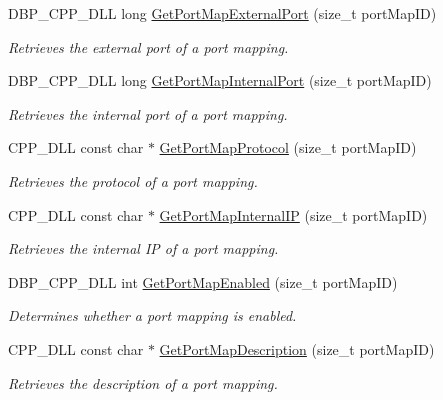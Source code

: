 \begin{DoxyCompactItemize}
DBP\_\-CPP\_\-DLL long \hyperlink{namespacemn_n_a_t_a592cb3bdeb5c5bd801a1a6f1f730007d}{GetPortMapExternalPort} (size\_\-t portMapID)
\begin{DoxyCompactList}\small\item\em Retrieves the external port of a port mapping. \item\end{DoxyCompactList}\item 
DBP\_\-CPP\_\-DLL long \hyperlink{namespacemn_n_a_t_ada1ec93ffca837a2fef02cb2d8466663}{GetPortMapInternalPort} (size\_\-t portMapID)
\begin{DoxyCompactList}\small\item\em Retrieves the internal port of a port mapping. \item\end{DoxyCompactList}\item 
CPP\_\-DLL const char $\ast$ \hyperlink{namespacemn_n_a_t_aee47b934f042fcfda5a6540bebbc4679}{GetPortMapProtocol} (size\_\-t portMapID)
\begin{DoxyCompactList}\small\item\em Retrieves the protocol of a port mapping. \item\end{DoxyCompactList}\item 
CPP\_\-DLL const char $\ast$ \hyperlink{namespacemn_n_a_t_ac37022019aa9496591be5c013f1e11f7}{GetPortMapInternalIP} (size\_\-t portMapID)
\begin{DoxyCompactList}\small\item\em Retrieves the internal IP of a port mapping. \item\end{DoxyCompactList}\item 
DBP\_\-CPP\_\-DLL int \hyperlink{namespacemn_n_a_t_a5dfa43e73d28ccc8ce428bebeb323774}{GetPortMapEnabled} (size\_\-t portMapID)
\begin{DoxyCompactList}\small\item\em Determines whether a port mapping is enabled. \item\end{DoxyCompactList}\item 
CPP\_\-DLL const char $\ast$ \hyperlink{namespacemn_n_a_t_a0d57b7debf7c97550f77a2c2cd35f678}{GetPortMapDescription} (size\_\-t portMapID)
\begin{DoxyCompactList}\small\item\em Retrieves the description of a port mapping. \item\end{DoxyCompactList}\item 

\end{DoxyCompactItemize}
